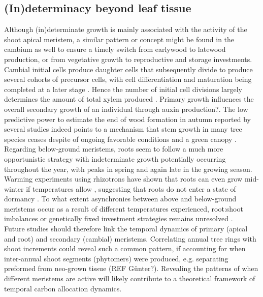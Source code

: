 \documentclass{article}
\begin{document}
\subsection*{(In)determinacy beyond leaf tissue} 
Although (in)determinate growth is mainly associated with the activity of the shoot apical meristem, a similar pattern or concept might be found in the cambium as well to ensure a timely switch from earlywood to latewood production, or from vegetative growth to reproductive and storage investments. Cambial initial cells produce daughter cells that subsequently divide to produce several cohorts of precursor cells, with cell differentiation and maturation being completed at a later stage \citep{valdovinos-ayalaSeasonalPatternsIncreases2022}. Hence the number of initial cell divisions largely determines the amount of total xylem produced \citep{lupiXylemPhenologyWood2010}. Primary growth influences the overall secondary growth of an individual through auxin production?. The low predictive power to estimate the end of wood formation in autumn reported by several studies \citep{buttoComparingCellDynamics2020} indeed points to a mechanism that stem growth in many tree species ceases despite of ongoing favorable conditions and a green canopy \citep{arendStemGrowthPhenology2024}.\\

Regarding below-ground meristems, roots seem to follow a much more opportunistic strategy with indeterminate growth potentially occurring throughout the year, with peaks in spring and again late in the growing season. Warming experiments using rhizotrons have shown that roots can even grow mid-winter if temperatures allow \citep{lyfordControlledGrowthForest1966}, suggesting that roots do not enter a state of dormancy \citep{radvilleRootPhenologyChanging2016}. To what extent asynchronies between above and below-ground meristems occur as a result of different temperatures experienced, root:shoot imbalances or genetically fixed investment strategies remains unresolved \citep{abramoffAreBelowgroundPhenology2015, makotoSynchronousAsynchronousRoot2020}.\\

 Future studies should therefore link the temporal dynamics of primary (apical and root) and secondary (cambial) meristems. Correlating annual tree rings with shoot increments could reveal such a common pattern, if accounting for when inter-annual shoot segments (phytomers) were produced, e.g. separating preformed from neo-grown tissue (REF Günter?). Revealing the patterns of when different meristems are active will likely contribute to a theoretical framework of temporal carbon allocation dynamics.
 
\end{document}
